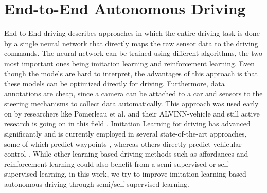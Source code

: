 \documentclass[12pt, letterpaper,cleardoubleempty,BCOR1cm]{scrbook}
\begin{document}
\section{End-to-End Autonomous Driving}
\label{sec:org7a8a387}
End-to-End driving describes approaches in which the entire driving task is done
by a single neural network that directly maps the raw sensor data to the driving
commands. The neural network can be trained using different algorithms, the two
most important ones being imitation learning and reinforcement learning. Even
though the models are hard to interpret, the advantages of this approach is that
these models can be optimized directly for driving. Furthermore, data
annotations are cheap, since a camera can be attached to a car and sensors to
the steering mechanisms to collect data automatically. This approach was used
early on by researchers like Pomerleau et al. and their ALVINN-vehicle
\cite{Pomerleau1988} and still active research is going on in this field
\cite{Janai2020,Tampuu2020}. Imitation Learning for driving has advanced
significantly \cite{Bojarski2016,Codevilla2017,Mueller2018} and is currently
employed in several state-of-the-art approaches, some of which predict waypoints
\cite{Casas2021,Chen2019,Filos2020}, whereas others directly predict vehicular
control
\cite{Behl2020,Buehler2020,Codevilla2019,9157137,Xiao2019,Prakash2020}. While
other learning-based driving methods such as affordances
\cite{Sauer2018,Xiao2020} and reinforcement learning
\cite{chen2021learning,Toromanoff2019,Wang2020a} could also benefit from a
semi-supervised or self-supervised learning, in this work, we try to improve
imitation learning based autonomous driving through semi/self-supervised
learning.
\end{document}
